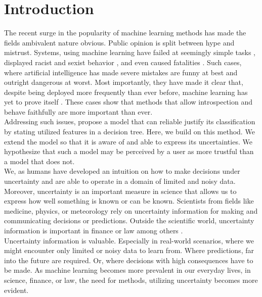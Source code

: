 \documentclass[a4paper,cleardoubleempty,BCOR1cm, 11pt]{report}
\begin{document}
\tableofcontents



\chapter{Introduction}
The recent surge in the popularity of machine learning methods has made the fields ambivalent nature obvious. Public opinion is split between hype and mistrust. 
Systems, using machine learning have failed at seemingly simple tasks \cite{kelion2018ces}, displayed racist and sexist behavior \cite{guynn2015google, schlesinger2018let, zou2018ai}, and even caused fatalities \cite{yadron2016tesla}.
Such cases, where artificial intelligence has made severe mistakes are funny at best and outright dangerous at worst. Most importantly, they have made it clear that, despite being deployed more frequently than ever before, machine learning has yet to prove itself \cite{schlesinger2018let, dikmen2016autonomous, zou2018ai}.
These cases show that methods that allow introspection and behave faithfully are more important than ever.\\
Addressing such issues, \citet{alaniz2019explainable} propose a model that can reliable justify its classification by stating utilized features in a decision tree. Here, we build on this method. We extend the model so that it is aware of and able to express its uncertainties. We hypothesize that such a model may be perceived by a user as more trustful than a model that does not.\\
We, as humans have developed an intuition on how to make decisions under uncertainty \cite{bland2012different} and are able to operate in a domain of limited and noisy data. Moreover, uncertainty is an important measure in science that allows us to express how well something is known or can be known. Scientists from fields like medicine, physics, or meteorology rely on uncertainty information for making and communicating decisions or predictions. Outside the scientific world, uncertainty information is important in finance or law among others \cite{liu2013toward, d1983legal}.\\
Uncertainty information is valuable. Especially in real-world scenarios, where we might encounter only limited or noisy data to learn from. Where predictions, far into the future are required. Or, where decisions with high consequences have to be made. 
As machine learning becomes more prevalent in our everyday lives, in science, finance, or law, the need for methods, utilizing uncertainty becomes more evident.\\
\end{document}
